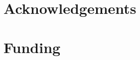 \documentclass{bioinfo}
\begin{document}
%

%


\section*{Acknowledgements}



\section*{Funding}


%
%
%
%
%


\end{document}
